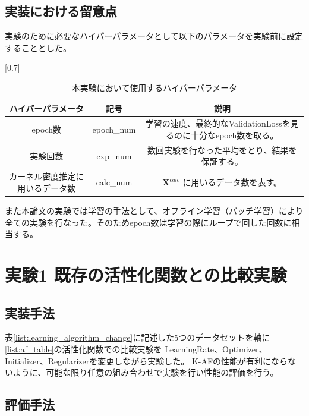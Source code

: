 \subsection{実装における留意点}
実験のために必要なハイパーパラメータとして以下のパラメータを実験前に設定することとした。

\begin{table}[htbp]
    \begin{center}
        \caption{本実験において使用するハイパーパラメータ}
        \vspace{2mm} 
        \scalebox{0.7}[0.7]{
            \begin{tabular}{||c | c |c||}
            ハイパーパラメータ & 記号 & 説明 \\
            \hline
            epoch数                           & epoch\_num      & 学習の速度、最終的なValidationLossを見るのに十分なepoch数を取る。  \\
            実験回数                           & exp\_num     & 数回実験を行なった平均をとり、結果を保証する。 \\
            カーネル密度推定に用いるデータ数        & calc\_num           & $ \mathbf{X}^{calc} $ に用いるデータ数を表す。  \\
            \end{tabular}
        }
    \end{center}
\end{table}

また本論文の実験では学習の手法として、オフライン学習（バッチ学習）により全ての実験を行なった。そのためepoch数は学習の際にループで回した回数に相当する。



\section{実験1 既存の活性化関数との比較実験}
\label{exp1}
\subsection{実装手法}

表\ref{list:learning_algorithm_change}に記述した5つのデータセットを軸に\ref{list:af_table}の活性化関数での比較実験を
LearningRate、Optimizer、Initializer、Regularizerを変更しながら実験した。
K-AFの性能が有利にならないように、可能な限り任意の組み合わせで実験を行い性能の評価を行う。



\subsection{評価手法}

